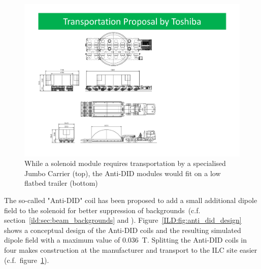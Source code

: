\begin{figure}[h!]
    \centering
    \includegraphics[width=0.8\hsize]{Integration/fig/Magnet_Transport.pdf}
    \caption{While a solenoid module requires transportation by a specialised Jumbo Carrier (top), the Anti-DID modules would fit on a low flatbed trailer (bottom)~\cite{ild:bib:Solenoid_Manufacturing}}
    \label{ILD:fig:magnet_transport}
\end{figure}

The so-called "Anti-DID" coil has been proposed to add a small additional dipole field to the solenoid for better suppression of backgrounds~(c.f. section~\ref{ild:sec:beam_backgrounds} and \cite{ild:bib:anti-did}). Figure~\ref{ILD:fig:anti_did_design} shows a conceptual design of the Anti-DID coils and the resulting simulated dipole field with a maximum value of 0.036~T. Splitting the Anti-DID coils in four makes construction at the manufacturer and transport to the ILC site easier (c.f.~figure~\ref{ILD:fig:magnet_transport}).

